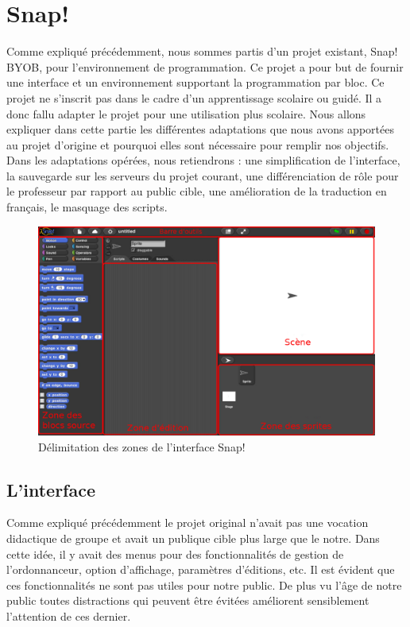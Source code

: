 \section{Snap!}
\label{solution SNAP}
Comme expliqué précédemment, nous sommes partis d'un projet existant, Snap! BYOB, pour l'environnement de programmation. Ce projet a pour but de fournir une interface et un environnement supportant la programmation par bloc. Ce projet ne s'inscrit pas dans le cadre d'un apprentissage scolaire ou guidé. Il a donc fallu adapter le projet pour une utilisation plus scolaire. Nous allons expliquer dans cette partie les différentes adaptations que nous avons apportées au projet d'origine et pourquoi elles sont nécessaire pour remplir nos objectifs.\\

Dans les adaptations opérées, nous retiendrons : une simplification de l'interface, la sauvegarde sur les serveurs du projet courant, une différenciation de rôle pour le professeur par rapport au public cible, une amélioration de la traduction en français, le masquage des scripts.

\begin{figure}[ht]
  \begin{center}
    \includegraphics[scale=0.3]{content/7-solution/2-snap/images/interface}
    \caption{Délimitation des zones de l'interface Snap!}
    \label{fig:snap interface}
  \end{center}
\end{figure}

\subsection{L'interface}
\label{interface}
Comme expliqué précédemment le projet original n'avait pas une vocation didactique de groupe et avait un publique cible plus large que le notre. Dans cette idée, il y avait des menus pour des fonctionnalités de gestion de l'ordonnanceur, option d'affichage, paramètres d'éditions, etc. Il est évident que ces fonctionnalités ne sont pas utiles pour notre public. De plus vu l'âge de notre public toutes distractions qui peuvent être évitées améliorent sensiblement l'attention de ces dernier.


